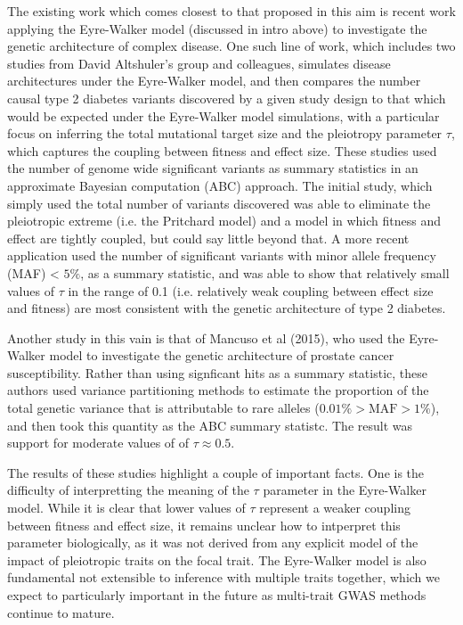 \documentclass[11pt]{article}
\begin{document}
The existing work which comes closest to that proposed in this aim is recent work applying the Eyre-Walker model (discussed in intro above) to investigate the genetic architecture of complex disease. One such line of work, which includes two studies from David Altshuler's group and colleagues, simulates disease architectures under the Eyre-Walker model, and then compares the number causal type 2 diabetes variants discovered by a given study design to that which would be expected under the Eyre-Walker model simulations, with a particular focus on inferring the total mutational target size and the pleiotropy parameter $\tau$, which captures the coupling between fitness and effect size. These studies used the number of genome wide significant variants \cite{Agarwala:2013bu,Fuchsberger:2016df} as summary statistics in an approximate Bayesian computation (ABC) approach. The initial study\cite{Agarwala:2013bu}, which simply used the total number of variants discovered was able to eliminate the pleiotropic extreme (i.e. the Pritchard model) and a model in which fitness and effect are tightly coupled, but could say little beyond that. A more recent application\cite{Fuchsberger:2016df} used the number of significant variants with minor allele frequency (MAF) < $5\%$, as a summary statistic, and was able to show that relatively small values of $\tau$ in the range of 0.1 (i.e. relatively weak coupling between effect size and fitness) are most consistent with the genetic architecture of type 2 diabetes.

Another study in this vain is that of Mancuso et al (2015)\cite{Mancuso:2015cp}, who used the Eyre-Walker model to investigate the genetic architecture of prostate cancer susceptibility. Rather than using signficant hits as a summary statistic, these authors used variance partitioning methods\cite{Yang:2011hd} to estimate the proportion of the total genetic variance that is attributable to rare alleles ($0.01\% > \text{MAF} > 1\%$), and then took this quantity as the ABC summary statistc. The result was support for moderate values of of $\tau \approx 0.5$.

The results of these studies highlight a couple of important facts. One is the difficulty of interpretting the meaning of the $\tau$ parameter in the Eyre-Walker model. While it is clear that lower values of $\tau$ represent a weaker coupling between fitness and effect size, it remains unclear how to intperpret this parameter biologically, as it was not derived from any explicit model of the impact of pleiotropic traits on the focal trait. The Eyre-Walker model is also fundamental not extensible to inference with multiple traits together, which we expect to particularly important in the future as multi-trait GWAS methods continue to mature.\cite{PickrellPairwise,SomeMatthewStephensPaper}
\end{document}

